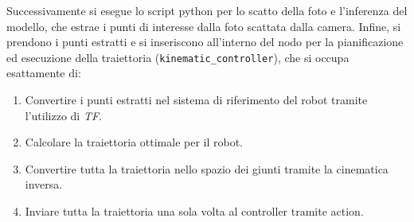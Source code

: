 Successivamente si esegue lo script python per lo scatto della foto e l'inferenza del modello, che estrae i punti di interesse dalla foto scattata dalla camera.
Infine, si prendono i punti estratti e si inseriscono all'interno del nodo per la pianificazione ed esecuzione della traiettoria (\texttt{kinematic\_controller}), che si occupa esattamente di:
\begin{enumerate}
    \item Convertire i punti estratti nel sistema di riferimento del robot tramite l'utilizzo di \textit{TF}.
    \item Calcolare la traiettoria ottimale per il robot.
    \item Convertire tutta la traiettoria nello spazio dei giunti tramite la cinematica inversa.
    \item Inviare tutta la traiettoria una sola volta al controller tramite action.
\end{enumerate}




\clearpage %


